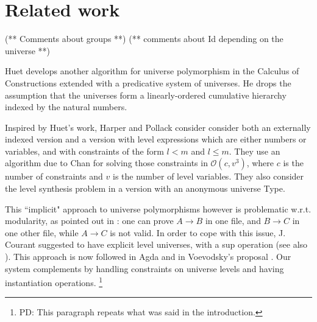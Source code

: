 \documentclass[11pt,a4paper]{article}
\theoremstyle{definition}
\newcommand{\Ordo}{\mathcal{O}}
\begin{document}
\section{Related work}

(** Comments about groups **)
(** comments about Id depending on the universe **)

Huet \cite{Huet87} develops another algorithm for universe polymorphism
in the Calculus of Constructions extended with a predicative system of universes.
He drops the assumption that the universes form a linearly-ordered cumulative hierarchy indexed by the natural numbers.

Inspired by Huet's work, Harper and Pollack
\cite{HarperP91} consider consider both an externally indexed version and a version
with level expressions which are either numbers or variables, and with constraints of the form $l < m$ and $l \leq m$. They use an algorithm due to Chan
for solving those constraints in $\Ordo(c,v^3)$, where $c$ is the number of constraints and $v$ is the number of level variables. They also consider the level synthesis problem in a version with an anonymous universe Type.

This ``implicit"
approach to universe polymorphisms however is problematic w.r.t. modularity, as pointed
out in \cite{Courant02,Simpson04}:
one can prove $A\rightarrow B$ in one file, and $B\rightarrow C$ in one other file, while
$A\rightarrow C$ is not valid. In order to cope with this issue, J. Courant \cite{Courant02}
suggested to have explicit level universes, with a sup operation (see also \cite{herbelin05}).
This approach is now followed in Agda and in Voevodsky's proposal \cite{VV}. Our system complements
\cite{Courant02,VV} by handling constraints on universe levels and having instantiation operations.
\footnote{PD: This paragraph repeats what was said in the introduction.}

\end{document}
